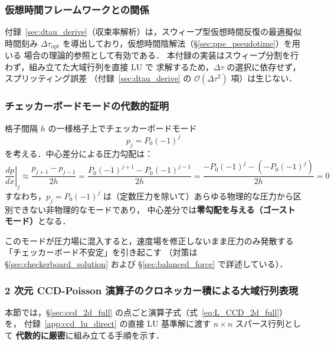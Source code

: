 \subsubsection*{仮想時間フレームワークとの関係}

付録~\ref{sec:dtau_derive}（収束率解析）は，スウィープ型仮想時間反復の最適擬似時間刻み
$\Delta\tau_{\mathrm{opt}}$ を導出しており，仮想時間陰解法（§\ref{sec:ppe_pseudotime}）を用いる
場合の理論的参照として有効である．
本付録の実装はスウィープ分割を行わず，組み立てた大域行列を直接 LU で
求解するため，$\Delta\tau$ の選択に依存せず，スプリッティング誤差
（付録~\ref{sec:dtau_derive} の $\mathcal{O}(\Delta\tau^2)$ 項）は生じない．

\subsubsection{チェッカーボードモードの代数的証明}
\label{app:checkerboard_mode}

格子間隔 $h$ の一様格子上でチェッカーボードモード
\begin{equation}
  p_j = P_0(-1)^j
\end{equation}
を考える．中心差分による圧力勾配は：
\[
  \left.\frac{dp}{dx}\right|_j \approx \frac{p_{j+1} - p_{j-1}}{2h}
  = \frac{P_0(-1)^{j+1} - P_0(-1)^{j-1}}{2h}
  = \frac{-P_0(-1)^j - (-P_0(-1)^j)}{2h} = 0
\]
すなわち，$p_j = P_0(-1)^j$ は（定数圧力を除いて）あらゆる物理的な圧力から区別できない非物理的なモードであり，
中心差分では\textbf{零勾配を与える（ゴーストモード）}となる．

このモードが圧力場に混入すると，速度場を修正しないまま圧力のみ発散する「チェッカーボード不安定」を引き起こす
（対策は §\ref{sec:checkerboard_solution} および §\ref{sec:balanced_force} で詳述している）．

\subsubsection{2 次元 CCD-Poisson 演算子のクロネッカー積による大域行列表現}
\label{app:ccd_kronecker}

本節では，§\ref{sec:ccd_2d_full} の点ごと演算子式（式~\eqref{eq:L_CCD_2d_full}）を，
付録~\ref{app:ccd_lu_direct} の直接 LU 基準解に渡す $n \times n$ スパース行列として
\textbf{代数的に厳密}に組み立てる手順を示す．

